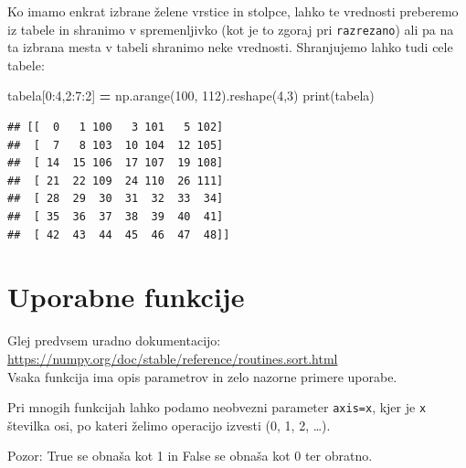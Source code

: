 \documentclass[
]{book}
\newenvironment{Shaded}{\begin{snugshade}}{\end{snugshade}}
\newcommand{\BuiltInTok}[1]{#1}
\newcommand{\DecValTok}[1]{\textcolor[rgb]{0.00,0.00,0.81}{#1}}
\newcommand{\NormalTok}[1]{#1}
\newcommand{\OperatorTok}[1]{\textcolor[rgb]{0.81,0.36,0.00}{\textbf{#1}}}
\begin{document}
Ko imamo enkrat izbrane želene vrstice in stolpce, lahko te vrednosti preberemo iz tabele in shranimo v spremenljivko (kot je to zgoraj pri \texttt{razrezano}) ali pa na ta izbrana mesta v tabeli shranimo neke vrednosti. Shranjujemo lahko tudi cele tabele:

\begin{Shaded}
\begin{Highlighting}[]
\NormalTok{tabela[}\DecValTok{0}\NormalTok{:}\DecValTok{4}\NormalTok{,}\DecValTok{2}\NormalTok{:}\DecValTok{7}\NormalTok{:}\DecValTok{2}\NormalTok{] }\OperatorTok{=}\NormalTok{ np.arange(}\DecValTok{100}\NormalTok{, }\DecValTok{112}\NormalTok{).reshape(}\DecValTok{4}\NormalTok{,}\DecValTok{3}\NormalTok{)}
\BuiltInTok{print}\NormalTok{(tabela)}
\end{Highlighting}
\end{Shaded}

\begin{verbatim}
## [[  0   1 100   3 101   5 102]
##  [  7   8 103  10 104  12 105]
##  [ 14  15 106  17 107  19 108]
##  [ 21  22 109  24 110  26 111]
##  [ 28  29  30  31  32  33  34]
##  [ 35  36  37  38  39  40  41]
##  [ 42  43  44  45  46  47  48]]
\end{verbatim}

\hypertarget{uporabne-funkcije}{%
\section{Uporabne funkcije}\label{uporabne-funkcije}}

Glej predvsem uradno dokumentacijo: \url{https://numpy.org/doc/stable/reference/routines.sort.html}\\
Vsaka funkcija ima opis parametrov in zelo nazorne primere uporabe.

Pri mnogih funkcijah lahko podamo neobvezni parameter \texttt{axis=x}, kjer je \texttt{x}
številka osi, po kateri želimo operacijo izvesti (0, 1, 2, \ldots).

Pozor: True se obnaša kot 1 in False se obnaša kot 0 ter obratno.
\end{document}
